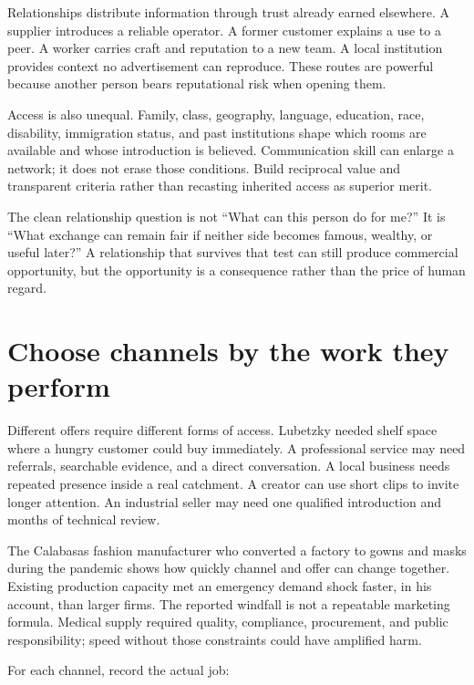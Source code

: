 Relationships distribute information through trust already earned elsewhere.
A supplier introduces a reliable operator. A former customer explains a use to
a peer. A worker carries craft and reputation to a new team. A local institution
provides context no advertisement can reproduce. These routes are powerful
because another person bears reputational risk when opening them.

Access is also unequal. Family, class, geography, language, education, race,
disability, immigration status, and past institutions shape which rooms are
available and whose introduction is believed. Communication skill can enlarge
a network; it does not erase those conditions. Build reciprocal value and
transparent criteria rather than recasting inherited access as superior merit.

The clean relationship question is not ``What can this person do for me?'' It
is ``What exchange can remain fair if neither side becomes famous, wealthy, or
useful later?'' A relationship that survives that test can still produce
commercial opportunity, but the opportunity is a consequence rather than the
price of human regard.

\section{Choose channels by the work they perform}

Different offers require different forms of access. Lubetzky needed shelf space
where a hungry customer could buy immediately. A professional service may need
referrals, searchable evidence, and a direct conversation. A local business
needs repeated presence inside a real catchment. A creator can use short clips
to invite longer attention. An industrial seller may need one qualified
introduction and months of technical review.

The Calabasas fashion manufacturer who converted a factory to gowns and masks
during the pandemic shows how quickly channel and offer can change together.
Existing production capacity met an emergency demand shock faster, in his
account, than larger firms. The reported windfall is not a repeatable marketing
formula. Medical supply required quality, compliance, procurement, and public
responsibility; speed without those constraints could have amplified harm.

For each channel, record the actual job:


